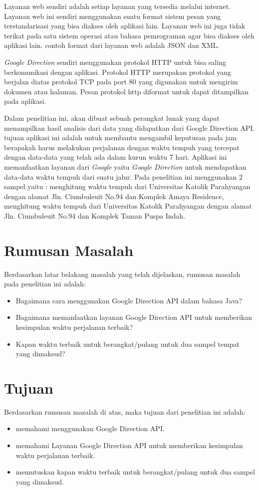 Layanan web sendiri adalah setiap layanan yang tersedia melalui internet. Layanan web ini sendiri menggunakan suatu format sistem pesan yang terstandarisasi yang bisa diakses oleh aplikasi lain. Layanan web ini juga tidak terikat pada satu sistem operasi atau bahasa pemrograman agar bisa diakses oleh aplikasi lain. contoh format dari layanan web adalah JSON dan XML.

\textit{Google Direction} sendiri menggunakan protokol HTTP untuk bisa saling berkomunikasi dengan aplikasi. Protokol HTTP merupakan protokol yang berjalan diatas protokol TCP pada port 80 yang digunakan untuk mengirim dokumen atau halaman. Pesan protokol http diformat untuk dapat ditampilkan pada aplikasi.

Dalam penelitian ini, akan dibuat sebuah perangkat lunak yang dapat menampilkan hasil analisis dari data yang didapatkan dari Google Direction API. tujuan aplikasi ini adalah untuk membantu mengambil keputusan pada jam berapakah harus melakukan perjalanan dengan waktu tempuh yang tercepat dengan data-data yang telah ada dalam kurun waktu 7 hari. Aplikasi ini memanfaatkan layanan dari \textit{Google} yaitu \textit{Google Direction} untuk mendapatkan data-data waktu tempuh dari suatu jalur. Pada penelitian ini menggunakan 2 sampel yaitu : menghitung waktu tempuh dari Universitas Katolik Parahyangan dengan alamat Jln. Ciumbuleuit No.94 dan Komplek Amaya Residence, menghitung waktu tempuh dari Universitas Katolik Parahyangan dengan alamat Jln. Ciumbuleuit No.94 dan Komplek Taman Puspa Indah.

\section{Rumusan Masalah}
\label{sec:rumusan}
Berdasarkan latar belakang masalah yang telah dijelaskan, rumusan masalah pada penelitian ini adalah:
\begin{itemize}
	\item Bagaimana cara menggunakan Google Direction API dalam bahasa Java?
	\item Bagaimana memanfaatkan layanan Google Direction API untuk memberikan kesimpulan waktu perjalanan terbaik?
	\item Kapan waktu terbaik untuk berangkat/pulang untuk dua sampel tempat yang dimaksud?
\end{itemize}

\section{Tujuan}
\label{sec:tujuan}
Berdasarkan rumusan masalah di atas, maka tujuan dari penelitian ini adalah:
\begin{itemize}
	\item memahami menggunakan Google Direction API.
	\item memahami Layanan Google Direction API untuk memberikan kesimpulan waktu perjalanan terbaik.
	\item memutuskan kapan waktu terbaik untuk berangkat/pulang untuk dua sampel yang dimaksud.
\end{itemize}


